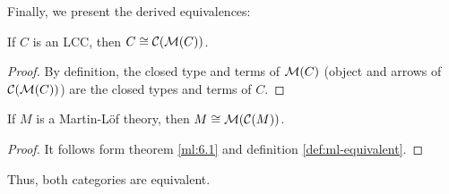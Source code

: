 
Finally, we present the derived equivalences:


\begin{theorem}\label{ml:6.1}
If $C$ is an LCC, then $C\cong \mathcal{C}(\mathcal{M}(C))$. 
\end{theorem}
\begin{proof}
  By definition, the closed type and terms of $\mathcal{M}(C)$ (object and arrows of $\mathcal{C}(\mathcal{M}(C))$)  are the closed types and terms of $C$.
\end{proof}

\begin{theorem}\label{ml:6.2}
If $M$ is a Martin-L\"of theory, then $M\cong \mathcal{M}(\mathcal{C}(M))$. 
\end{theorem}
\begin{proof}
It follows form theorem \ref{ml:6.1} and definition \ref{def:ml-equivalent}.
\end{proof}

Thus, both categories are equivalent.

